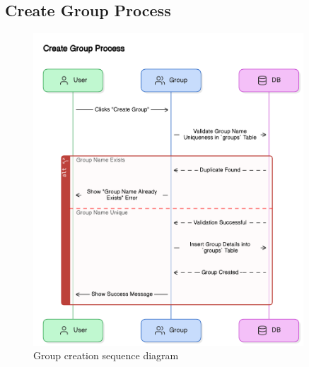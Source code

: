 \subsection{Create Group Process}
\begin{figure}[H]
    \centering
    \includegraphics[width=0.9\textwidth]{images/sequence_diagrams/create_group_process.png}
    \caption{Group creation sequence diagram}
    \label{fig:create_group}
\end{figure}

